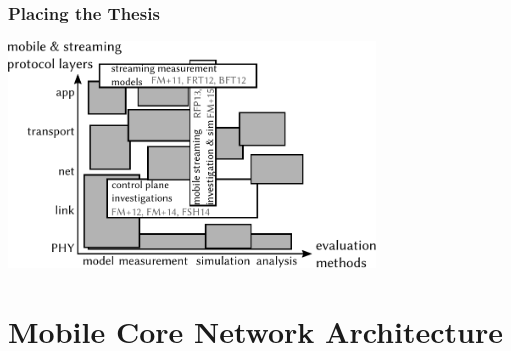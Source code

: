 \documentclass{beamer}
\begin{document}
\begin{frame}
	\frametitle{Placing the Thesis}

	\begin{center}
		\includegraphics[height=6cm]{extras/placement.pdf}
	\end{center}

\end{frame}





\section{Mobile Core Network Architecture}



\end{document}
